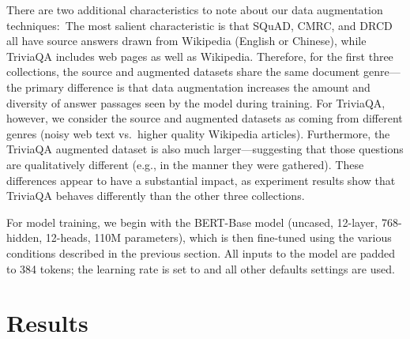 \documentclass[11pt,a4paper]{article}
\begin{document}
There are two additional characteristics to note about our data augmentation techniques:\
The most salient characteristic is that SQuAD, CMRC, and DRCD all have source answers drawn from Wikipedia (English or Chinese), while TriviaQA includes web pages as well as Wikipedia.
Therefore, for the first three collections, the source and augmented datasets share the same document genre---the primary difference is that data augmentation increases the amount and diversity of answer passages seen by the model during training.
For TriviaQA, however, we consider the source and augmented datasets as coming from different genres (noisy web text vs.\ higher quality Wikipedia articles).
Furthermore, the TriviaQA augmented dataset is also much larger---suggesting that those questions are qualitatively different (e.g., in the manner they were gathered).
These differences appear to have a substantial impact, as experiment results show that TriviaQA behaves differently than the other three collections.

For model training, we begin with the BERT-Base model (uncased, 12-layer, 768-hidden, 12-heads, 110M parameters), which is then fine-tuned using the various conditions described in the previous section.
All inputs to the model are padded to 384 tokens; the learning rate is set to  and all other defaults settings are used.

\section{Results}
\end{document}
